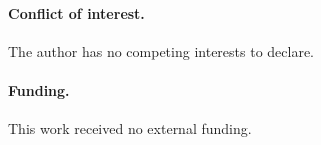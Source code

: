 \documentclass[review,12pt]{elsarticle}
\begin{document}
\paragraph*{Conflict of interest.} The author has no competing interests to declare.

\paragraph*{Funding.} This work received no external funding.



\end{document}
